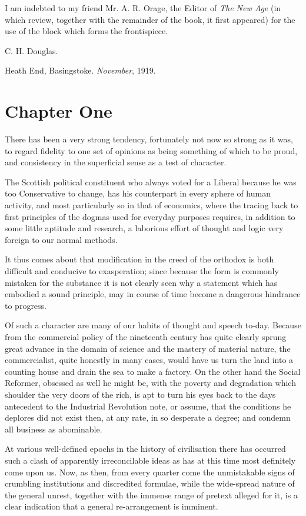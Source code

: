 \documentclass{book}
\begin{document}
I am indebted to my friend Mr. A. R. Orage, the Editor of \emph{The New Age} (in which review, together with the remainder of the book, it first appeared) for the use of the block which forms the frontispiece.

C. H. Douglas.

Heath End, Basingstoke. \emph{November}, 1919.

\chapter{Chapter One}
\label{chapter-1}
There has been a very strong tendency, fortunately not now so strong as it was, to regard fidelity to one set of opinions as being something of which to be proud, and consistency in the superficial sense as a test of character.

The Scottish political constituent who always voted for a Liberal because he was too Conservative to change, has his counterpart in every sphere of human activity, and most particularly so in that of economics, where the tracing back to first principles of the dogmas used for everyday purposes requires, in addition to some little aptitude and research, a laborious effort of thought and logic very foreign to our normal methods.

It thus comes about that modification in the creed of the orthodox is both difficult and conducive to exasperation; since because the form is commonly mistaken for the substance it is not clearly seen why a statement which has embodied a sound principle, may in course of time become a dangerous hindrance to progress.

Of such a character are many of our habits of thought and speech to-day. Because from the commercial policy of the nineteenth century has quite clearly sprung great advance in the domain of science and the mastery of material nature, the commercialist, quite honestly in many cases, would have us turn the land into a counting house and drain the sea to make a factory. On the other hand the Social Reformer, obsessed as well he might be, with the poverty and degradation which shoulder the very doors of the rich, is apt to turn his eyes back to the days antecedent to the Industrial Revolution note, or assume, that the conditions he deplores did not exist then, at any rate, in so desperate a degree; and condemn all business as abominable.

At various well-defined epochs in the history of civilisation there has occurred such a clash of apparently irreconcilable ideas as has at this time most definitely come upon us. Now, as then, from every quarter come the unmistakable signs of crumbling institutions and discredited formulae, while the wide-spread nature of the general unrest, together with the immense range of pretext alleged for it, is a clear indication that a general re-arrangement is imminent.
\end{document}
